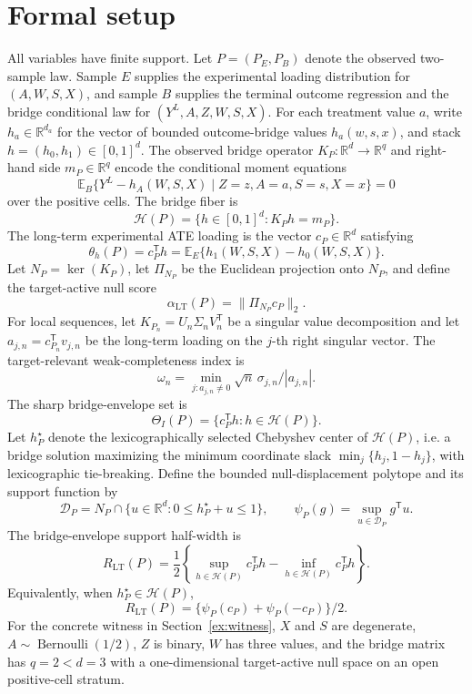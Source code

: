 \documentclass[11pt]{article}
\newcommand{\E}{\mathbb{E}}
\newcommand{\transpose}{\mathsf{T}}
\newcommand{\calH}{\mathcal{H}}
\newcommand{\R}{\mathbb{R}}
\theoremstyle{definition}
\theoremstyle{plain}
\theoremstyle{remark}
\begin{document}
\section{Formal setup}
All variables have finite support.  Let \(P=(P_E,P_B)\) denote the observed
two-sample law.  Sample \(E\) supplies the experimental loading distribution
for \((A,W,S,X)\), and sample \(B\) supplies the terminal outcome regression and
the bridge conditional law for \((Y^L,A,Z,W,S,X)\).  For each treatment value
\(a\), write \(h_a\in\R^{d_a}\) for the vector of bounded outcome-bridge values
\(h_a(w,s,x)\), and stack \(h=(h_0,h_1)\in[0,1]^d\).  The observed bridge
operator \(K_P:\R^d\to\R^q\) and right-hand side \(m_P\in\R^q\) encode the
conditional moment equations
\[
  \E_B\{Y^L-h_A(W,S,X)\mid Z=z,A=a,S=s,X=x\}=0
\]
over the positive cells.  The bridge fiber is
\[
  \calH(P)=\{h\in[0,1]^d:K_P h=m_P\}.
\]
The long-term experimental ATE loading is the vector \(c_P\in\R^d\) satisfying
\[
  \theta_h(P)=c_P^\transpose h
  =\E_E\{h_1(W,S,X)-h_0(W,S,X)\}.
\]
Let \(N_P=\ker(K_P)\), let \(\Pi_{N_P}\) be the Euclidean projection onto
\(N_P\), and define the target-active null score
\[
  \alpha_{\mathrm{LT}}(P)=\|\Pi_{N_P}c_P\|_2.
\]
For local sequences, let \(K_{P_n}=U_n \Sigma_n V_n^\transpose\) be a singular
value decomposition and let \(a_{j,n}=c_{P_n}^\transpose v_{j,n}\) be the
long-term loading on the \(j\)-th right singular vector.  The target-relevant
weak-completeness index is
\[
  \omega_n=\min_{j:a_{j,n}\neq 0}\sqrt{n}\,\sigma_{j,n}/|a_{j,n}|.
\]
The sharp bridge-envelope set is
\[
  \Theta_I(P)=\{c_P^\transpose h:h\in\calH(P)\}.
\]
Let \(h_P^\star\) denote the lexicographically selected Chebyshev center of
\(\calH(P)\), i.e. a bridge solution maximizing the minimum coordinate slack
\(\min_j\{h_j,1-h_j\}\), with lexicographic tie-breaking.  Define the bounded
null-displacement polytope and its support function by
\[
  \mathcal{D}_P=N_P\cap\{u\in\R^d:0\le h_P^\star+u\le1\},\qquad
  \psi_P(g)=\sup_{u\in\mathcal{D}_P}g^\transpose u .
\]
The bridge-envelope support half-width is
\[
  R_{\mathrm{LT}}(P)=\frac12\left\{\sup_{h\in\calH(P)}c_P^\transpose h
  -\inf_{h\in\calH(P)}c_P^\transpose h\right\}.
\]
Equivalently, when \(h_P^\star\in\calH(P)\),
\[
  R_{\mathrm{LT}}(P)=\{\psi_P(c_P)+\psi_P(-c_P)\}/2 .
\]
For the concrete witness in Section~\ref{ex:witness}, \(X\) and \(S\) are
degenerate, \(A\sim\operatorname{Bernoulli}(1/2)\), \(Z\) is binary, \(W\) has
three values, and the bridge matrix has \(q=2<d=3\) with a one-dimensional
target-active null space on an open positive-cell stratum.
\end{document}
